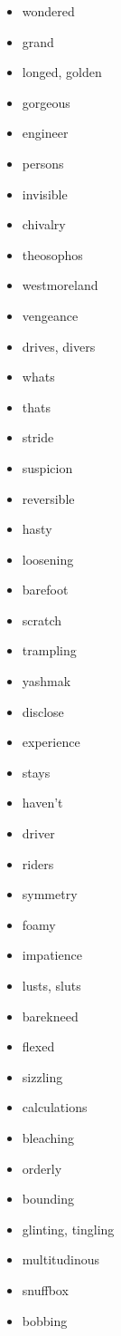 \documentclass{article}
\begin{document}
\begin{itemize}
    \item wondered
    \item grand
    \item longed, golden
    \item gorgeous
    \item engineer
    \item persons
    \item invisible
    \item chivalry
    \item theosophos
    \item westmoreland
    \item vengeance
    \item drives, divers
    \item whats
    \item thats
    \item stride
    \item suspicion
    \item reversible
    \item hasty
    \item loosening
    \item barefoot
    \item scratch
    \item trampling
    \item yashmak
    \item disclose
    \item experience
    \item stays
    \item haven't
    \item driver
    \item riders
    \item symmetry
    \item foamy
    \item impatience
    \item lusts, sluts
    \item barekneed
    \item flexed
    \item sizzling
    \item calculations
    \item bleaching
    \item orderly
    \item bounding
    \item glinting, tingling
    \item multitudinous
    \item snuffbox
    \item bobbing

\end{itemize}
\end{document}
